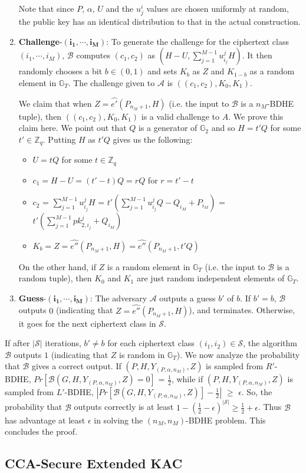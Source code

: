 \begin{enumerate}
 Note that since $P$, $\alpha$, $U$ and the $u^{i}_{j}$ values are chosen uniformly at random, the public key has an identical distribution to that in the actual construction.
 
 \item \textbf{Challenge}-$\mathbf{(i_1,\cdots,i_M)}$: To generate the challenge for the ciphertext class $(i_1,\cdots,i_M)$, $\mathcal{B}$ computes $(c_1,c_2)$ as $(H-U,\sum_{j=1}^{M-1}u^{j}_{i_j}H)$. It then randomly chooses a bit $b\in{(0,1)}$ and sets $K_b$ as $Z$ and $K_{1-b}$ as a random element in $\mathbb{G}_T$. The challenge given to $\mathcal{A}$ is $((c_1,c_2),K_0,K_1)$. 
 
 We claim that when $Z=\hat{e'}(P_{n_M+1},H)$ (i.e. the input to $\mathcal{B}$ is a $n_M$-BDHE tuple), then $((c_1,c_2),K_0,K_1)$ is a valid challenge to $A$. We prove this claim here. We point out that $Q$ is a generator of $\mathbb{G}_2$ and so $H=t'Q$ for some $t'\in\mathbb{Z}_q$. Putting $H$ as $t'Q$ gives us the following:
 \begin{itemize}
  \item  $U=tQ$ for some $t\in\mathbb{Z}_q$
  \item $c_1=H-U=(t'-t)Q=rQ$ for $r=t'-t$
  \item $c_2$ = $\sum_{j=1}^{M-1}u^{j}_{i_j}H$ = $t'(\sum_{j=1}^{M-1}u^{j}_{i_j}Q-Q_{i_M}+P_{i_M})$ = $t'(\sum_{j=1}^{M-1}pk^{j}_{2,i_j}+Q_{i_M})$
  \item $K_b=Z=\hat{e''}(P_{n_M+1},H)=\hat{e''}(P_{n_M+1},t'Q)$
 \end{itemize}
 On the other hand, if $Z$ is a random element in $\mathbb{G}_T$ (i.e. the input to $\mathcal{B}$ is a random tuple), then $K_0$ and $K_1$ are just random independent elements of $\mathbb{G}_T$.
 
 \item\textbf{Guess}-$\mathbf{(i_1,\cdots,i_M)}$: The adversary $\mathcal{A}$ outputs a guess $b'$ of $b$. If $b' = b$, $\mathcal{B}$ outputs $0$ (indicating that $Z = \hat{e''}(P_{n_M+1},H)$), and terminates. Otherwise, it goes for the next ciphertext class in $\mathcal{S}$.
\end{enumerate}

If after $|\mathcal{S}|$ iterations, $b' \neq b$ for each ciphertext class $(i_1,i_2)\in\mathcal{S}$, the algorithm $\mathcal{B}$ outputs $1$ (indicating that $Z$ is random in $\mathbb{G}_T$). We now analyze the probability that $\mathcal{B}$ gives a correct output. If $(P,H,Y_{(P,\alpha,n_M)},Z)$ is sampled from $R'$-BDHE, $Pr[\mathcal{B}(G,H,Y_{(P,\alpha,n_M)},Z)=0]$ = $\frac{1}{2}$, while if $(P,H,Y_{(P,\alpha,n_M)},Z)$ is sampled from $L'$-BDHE, $|Pr[\mathcal{B}(G,H,Y_{(P,\alpha,n_M)},Z)]-\frac{1}{2}|$ $\geq$ $\epsilon$. So, the probability that $\mathcal{B}$ outputs correctly is at least $1-(\frac{1}{2}-\epsilon)^{|\mathcal{S}|} \geq \frac{1}{2}+\epsilon$. Thus $\mathcal{B}$ has advantage at least $\epsilon$ in solving the $(n_M,n_M)$-BDHE problem. This concludes the proof. 

\subsection{CCA-Secure Extended KAC}
\label{subsec:cca_extended}
